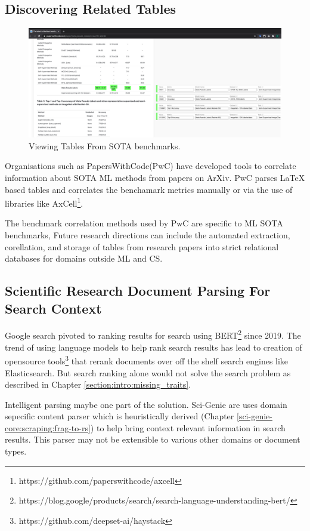 \subsection{Discovering Related Tables}
\begin{figure}[h]
    \centering
    \includegraphics[width=\maxwidth{\textwidth}]{src/images/pwc-table-exp.pdf}
    \caption{ Viewing Tables From SOTA benchmarks.  }
    \label{figure\arabic{figurecounter}}
\end{figure}
Organisations such as PapersWithCode(PwC) have developed tools to correlate information about SOTA ML methods from papers on ArXiv. PwC parses LaTeX based tables and correlates the benchamark metrics manually or via the use of libraries like AxCell\footnote{https://github.com/paperswithcode/axcell}. 

The benchmark correlation methods used by PwC are specific to ML SOTA benchmarks, Future research directions can include the automated extraction, corellation, and storage of tables from research papers into strict relational databases for domains outside ML and CS. 

\subsection{Scientific Research Document Parsing For Search Context}
Google search pivoted to ranking results for search using BERT\footnote{https://blog.google/products/search/search-language-understanding-bert/} since 2019. The trend of using language models to help rank search results has lead to creation of opensource tools\footnote{https://github.com/deepset-ai/haystack} that rerank documents over off the shelf search engines like Elasticsearch. But search ranking alone would not solve the search problem as described in Chapter \ref{section:intro:missing_traits}.

Intelligent parsing maybe one part of the solution. Sci-Genie are uses domain sepecific content parser which is heuristically derived (Chapter \ref{sci-genie-core:scraping:frag-to-rs}) to help bring context relevant information in search results. This parser may not be extensible to various other domains or document types.

